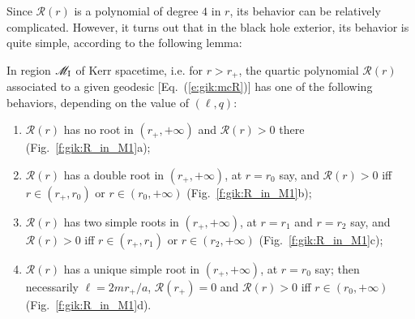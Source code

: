 Since $\mathcal{R}(r)$ is a polynomial of degree $4$ in $r$, its
behavior can be relatively complicated. However, it turns out that in the
black hole exterior, its behavior is quite simple, according to the
following lemma:
\begin{lemma}
\label{p:gik:lem_R_r}
In region $\mathscr{M}_{\rm I}$ of Kerr spacetime, i.e. for $r> r_+$, the
quartic polynomial $\mathcal{R}(r)$ associated to a given geodesic
[Eq.~(\ref{e:gik:mcR})] has one of the following behaviors, depending
on the value of $(\ell, q)$:
\begin{enumerate}
\item $\mathcal{R}(r)$ has no root in $(r_+,+\infty)$ and $\mathcal{R}(r) > 0$
there (Fig.~\ref{f:gik:R_in_M1}a);
\item $\mathcal{R}(r)$ has a double root in $(r_+,+\infty)$, at $r=r_0$ say, and
$\mathcal{R}(r) > 0$ iff $r\in(r_+, r_0)$ or $r\in(r_0, +\infty)$
(Fig.~\ref{f:gik:R_in_M1}b);
\item $\mathcal{R}(r)$ has two simple roots in $(r_+,+\infty)$, at $r=r_1$ and $r=r_2$ say, and
$\mathcal{R}(r) > 0$ iff $r\in(r_+, r_1)$ or $r\in(r_2, +\infty)$
(Fig.~\ref{f:gik:R_in_M1}c);
\item $\mathcal{R}(r)$ has a unique simple root in $(r_+,+\infty)$, at $r=r_0$ say; then
necessarily $\ell = 2 m r_+ /a$, $\mathcal{R}(r_+) = 0$ and
$\mathcal{R}(r) > 0$ iff $r\in(r_0, +\infty)$
(Fig.~\ref{f:gik:R_in_M1}d).
\end{enumerate}
\end{lemma}
